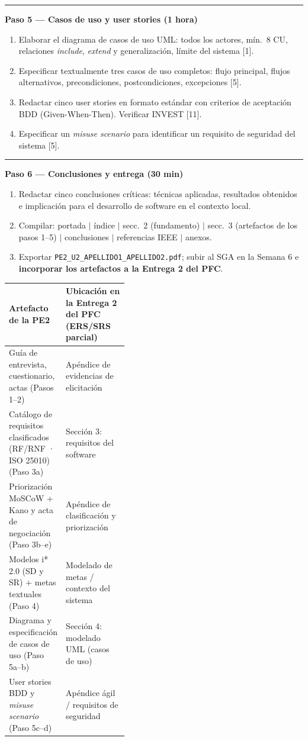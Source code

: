\documentclass[11pt,a4paper]{article}
\newcommand{\submark}[1]{\par\vspace{4pt}\noindent
  {\color{secblue}\rule[-1pt]{3.5pt}{12pt}}\hspace{6pt}\textbf{\color{secdark}#1}\par\vspace{2pt}}
\begin{document}
\submark{Paso 5 — Casos de uso y user stories (1 hora)}
\begin{enumerate}[label=\alph*)]
\item Elaborar el diagrama de casos de uso UML: todos los actores, mín.\ 8 CU, relaciones \textit{include}, \textit{extend} y generalización, límite del sistema [1].
\item Especificar textualmente tres casos de uso completos: flujo principal, flujos alternativos, precondiciones, postcondiciones, excepciones [5].
\item Redactar cinco user stories en formato estándar con criterios de aceptación BDD (Given-When-Then). Verificar INVEST [11].
\item Especificar un \textit{misuse scenario} para identificar un requisito de seguridad del sistema [5].
\end{enumerate}

\submark{Paso 6 — Conclusiones y entrega (30 min)}
\begin{enumerate}[label=\alph*)]
\item Redactar cinco conclusiones críticas: técnicas aplicadas, resultados obtenidos e implicación para el desarrollo de software en el contexto local.
\item Compilar: portada $|$ índice $|$ secc.\ 2 (fundamento) $|$ secc.\ 3 (artefactos de los pasos 1–5) $|$ conclusiones $|$ referencias IEEE $|$ anexos.
\item Exportar \texttt{PE2\_U2\_APELLIDO1\_APELLIDO2.pdf}; subir al SGA en la Semana 6 e \textbf{incorporar los artefactos a la Entrega 2 del PFC}.
\end{enumerate}

\begin{notabox}[title={Trazabilidad práctica PE2 $\rightarrow$ Entrega 2 del PFC}]
\renewcommand{\arraystretch}{1.2}
\small
\noindent\begin{tabularx}{\linewidth}{@{}p{0.40\linewidth} X@{}}
\textbf{Artefacto de la PE2} & \textbf{Ubicación en la Entrega 2 del PFC (ERS/SRS parcial)}\\
\hline
Guía de entrevista, cuestionario, actas (Pasos 1–2) & Apéndice de evidencias de elicitación\\
Catálogo de requisitos clasificados (RF/RNF · ISO 25010) (Paso 3a) & Sección 3: requisitos del software\\
Priorización MoSCoW + Kano y acta de negociación (Paso 3b–e) & Apéndice de clasificación y priorización\\
Modelos i* 2.0 (SD y SR) + metas textuales (Paso 4) & Modelado de metas / contexto del sistema\\
Diagrama y especificación de casos de uso (Paso 5a–b) & Sección 4: modelado UML (casos de uso)\\
User stories BDD y \textit{misuse scenario} (Paso 5c–d) & Apéndice ágil / requisitos de seguridad\\
\end{tabularx}
\end{notabox}
\end{document}
